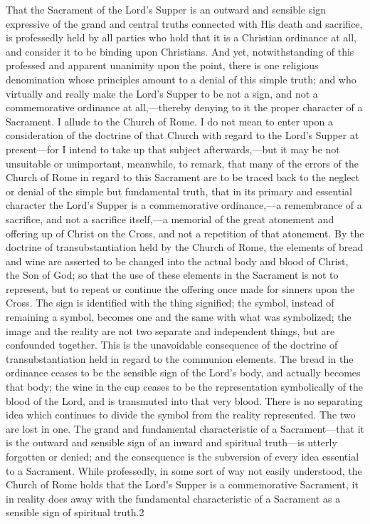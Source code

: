 \documentclass[]{book}
\begin{document}
That the Sacrament of the Lord's Supper is an outward and sensible sign expressive of the grand and central truths connected with His death and sacrifice, is professedly held by all parties who hold that it is a Christian ordinance at all, and consider it to be binding upon Christians. And yet, notwithstanding of this professed and apparent unanimity upon the point, there is one religious denomination whose principles amount to a denial of this simple truth; and who virtually and really make the Lord's Supper to be not a sign, and not a commemorative ordinance at all,---thereby denying to it the proper character of a Sacrament. I allude to the Church of Rome. I do not mean to enter upon a consideration of the doctrine of that Church with regard to the Lord's Supper at present---for I intend to take up that subject afterwards,---but it may be not unsuitable or unimportant, meanwhile, to remark, that many of the errors of the Church of Rome in regard to this Sacrament are to be traced back to the neglect or denial of the simple but fundamental truth, that in its primary and essential character the Lord's Supper is a commemorative ordinance,---a remembrance of a sacrifice, and not a sacrifice itself,---a memorial of the great atonement and offering up of Christ on the Cross, and not a repetition of that atonement. By the doctrine of transubstantiation held by the Church of Rome, the elements of bread and wine are asserted to be changed into the actual body and blood of Christ, the Son of God; so that the use of these elements in the Sacrament is not to represent, but to repeat or continue the offering once made for sinners upon the Cross. The sign is identified with the thing signified; the symbol, instead of remaining a symbol, becomes one and the same with what was symbolized; the image and the reality are not two separate and independent things, but are confounded together. This is the unavoidable consequence of the doctrine of transubstantiation held in regard to the communion elements. The bread in the ordinance ceases to be the sensible sign of the Lord's body, and actually becomes that body; the wine in the cup ceases to be the representation symbolically of the blood of the Lord, and is transmuted into that very blood. There is no separating idea which continues to divide the symbol from the reality represented. The two are lost in one. The grand and fundamental characteristic of a Sacrament---that it is the outward and sensible sign of an inward and spiritual truth---is utterly forgotten or denied; and the consequence is the subversion of every idea essential to a Sacrament. While professedly, in some sort of way not easily understood, the Church of Rome holds that the Lord's Supper is a commemorative Sacrament, it in reality does away with the fundamental characteristic of a Sacrament as a sensible sign of spiritual truth.2
\end{document}
